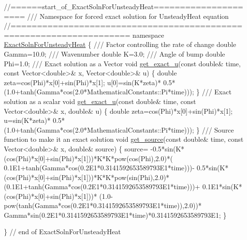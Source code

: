 
\begin{DoxyCodeInclude}
\textcolor{comment}{//======start\_of\_ExactSolnForUnsteadyHeat=====================}
\textcolor{comment}{/// Namespace for forced exact solution for UnsteadyHeat equation }
\textcolor{comment}{}\textcolor{comment}{//====================================================================}
\textcolor{keyword}{namespace }\hyperlink{namespaceExactSolnForUnsteadyHeat}{ExactSolnForUnsteadyHeat}
\{
\textcolor{comment}{}
\textcolor{comment}{ /// Factor controlling the rate of change}
\textcolor{comment}{} \textcolor{keywordtype}{double} Gamma=10.0;
\textcolor{comment}{}
\textcolor{comment}{ /// Wavenumber}
\textcolor{comment}{} \textcolor{keywordtype}{double} K=3.0;
\textcolor{comment}{}
\textcolor{comment}{ /// Angle of bump}
\textcolor{comment}{} \textcolor{keywordtype}{double} Phi=1.0; 
 \textcolor{comment}{}
\textcolor{comment}{ /// Exact solution as a Vector}
\textcolor{comment}{} \textcolor{keywordtype}{void} \hyperlink{namespaceExactSolnForUnsteadyHeat_a1d5b22857bd2a7825397daf1cf9c89eb}{get\_exact\_u}(\textcolor{keyword}{const} \textcolor{keywordtype}{double}& time, \textcolor{keyword}{const} Vector<double>& x, 
                  Vector<double>& u)
 \{
  \textcolor{keywordtype}{double} zeta=cos(Phi)*x[0]+sin(Phi)*x[1];
  u[0]=sin(K*zeta)*
       0.5*(1.0+tanh(Gamma*cos(2.0*MathematicalConstants::Pi*time)));
 \}
 \textcolor{comment}{}
\textcolor{comment}{ /// Exact solution as a scalar}
\textcolor{comment}{} \textcolor{keywordtype}{void} \hyperlink{namespaceExactSolnForUnsteadyHeat_a1d5b22857bd2a7825397daf1cf9c89eb}{get\_exact\_u}(\textcolor{keyword}{const} \textcolor{keywordtype}{double}& time, \textcolor{keyword}{const} Vector<double>& x, \textcolor{keywordtype}{double}& u)
 \{
  \textcolor{keywordtype}{double} zeta=cos(Phi)*x[0]+sin(Phi)*x[1];
  u=sin(K*zeta)*
       0.5*(1.0+tanh(Gamma*cos(2.0*MathematicalConstants::Pi*time)));
 \}
 \textcolor{comment}{}
\textcolor{comment}{ /// Source function to make it an exact solution }
\textcolor{comment}{} \textcolor{keywordtype}{void} \hyperlink{namespaceExactSolnForUnsteadyHeat_ab4e853d6368b1fcdbd6205079687455a}{get\_source}(\textcolor{keyword}{const} \textcolor{keywordtype}{double}& time, \textcolor{keyword}{const} Vector<double>& x, \textcolor{keywordtype}{double}& source)
 \{
  source=
   -0.5*sin(K*(cos(Phi)*x[0]+sin(Phi)*x[1]))*K*K*pow(cos(Phi),2.0)*(
    0.1E1+tanh(Gamma*cos(0.2E1*0.3141592653589793E1*time)))-
   0.5*sin(K*(cos(Phi)*x[0]+sin(Phi)*x[1]))*K*K*pow(sin(Phi),2.0)*
   (0.1E1+tanh(Gamma*cos(0.2E1*0.3141592653589793E1*time)))+
   0.1E1*sin(K*(cos(Phi)*x[0]+sin(Phi)*x[1]))*
   (1.0-pow(tanh(Gamma*cos(0.2E1*0.3141592653589793E1*time)),2.0))*
   Gamma*sin(0.2E1*0.3141592653589793E1*time)*0.3141592653589793E1;
 \}

\} \textcolor{comment}{// end of ExactSolnForUnsteadyHeat}

\end{DoxyCodeInclude}




